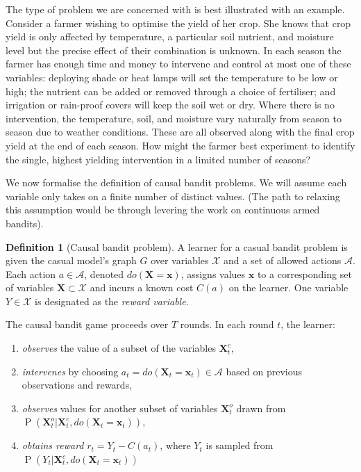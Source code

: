 \documentclass[11pt,a4paper,twoside]{report}
\newcommand{\actionspace}{\mathcal{A}}
\renewcommand{\P}[1]{\operatorname{P}\left(#1\right)}
\renewcommand{\vec}[1]{\boldsymbol{#1}}
\theoremstyle{plain}
\theoremstyle{definition}
\newtheorem{definition}[theorem]{Definition}
\begin{document}
The type of problem we are concerned with is best illustrated with an example. Consider a farmer wishing to optimise the yield of her crop. She knows that crop yield is only affected by temperature, a particular soil nutrient, and moisture level but the precise effect of their combination is unknown. In each season the farmer has enough time and money to intervene and control at most one of these
variables: deploying shade or heat lamps will set the temperature to be low or high; the nutrient can be added or removed through a choice of fertiliser; and irrigation or rain-proof covers will keep the soil wet or dry. Where there is no intervention, the temperature, soil, and moisture vary naturally from season to season due to weather conditions. These are all observed along with the final crop yield at the end of each season. How might the farmer best experiment to identify the single, highest yielding intervention in a limited number of seasons?

We now formalise the definition of causal bandit problems. We will assume each variable only takes on a finite number of distinct values. (The path to relaxing this assumption would be through levering the work on continuous armed bandits). 

\vspace*{.5cm}
\begin{definition}[Causal bandit problem]
A learner for a casual bandit problem is given the casual model’s graph $G$ over variables $\mathcal{X}$ and a set of allowed actions $\actionspace$. Each action $a \in \actionspace$, denoted $do(\vec{X}=\vec{x})$, assigns values $\vec{x}$ to a corresponding set of variables $\vec{X} \subset \mathcal{X}$ and incurs a known cost $C(a)$ on the learner. One variable $Y \in \mathcal{X}$ is designated as the \emph{reward variable}.

The causal bandit game proceeds over $T$ rounds. In each round $t$, the learner:
\begin{enumerate}
\item \emph{observes} the value of a subset of the variables $\vec{X}^c_t$,
\item \emph{intervenes} by choosing $a_t = do(\vec{X}_t = \vec{x}_t) \in \mathcal{A}$ based on previous observations and rewards, 
\item \emph{observes} values for another subset of variables $\vec{X}^o_t$ drawn from $\P{\vec{X}^o_t |\vec{X}^c_t, do(\vec{X}_t = \vec{x}_t)}$,
\item \emph{obtains reward} $r_t = Y_t - C(a_t)$, where $Y_t$ is sampled from $\P{Y_t| \vec{X}^c_t, do(\vec{X}_t = \vec{x}_t)}$
\end{enumerate} 
\end{definition}
\end{document}

